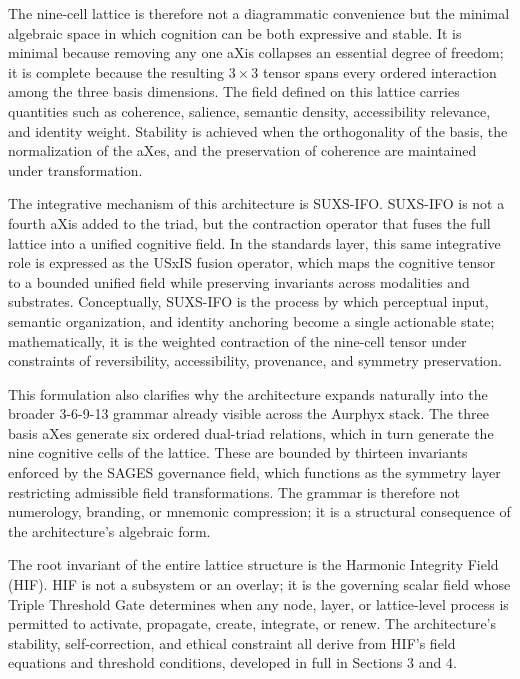 The nine-cell lattice is therefore not a diagrammatic convenience but the minimal algebraic space in which cognition can be both expressive and stable. It is minimal because removing any one aXis collapses an essential degree of freedom; it is complete because the resulting \(3 \times 3\) tensor spans every ordered interaction among the three basis dimensions. The field defined on this lattice carries quantities such as coherence, salience, semantic density, accessibility relevance, and identity weight. Stability is achieved when the orthogonality of the basis, the normalization of the aXes, and the preservation of coherence are maintained under transformation.

The integrative mechanism of this architecture is SUXS-IFO. SUXS-IFO is not a fourth aXis added to the triad, but the contraction operator that fuses the full lattice into a unified cognitive field. In the standards layer, this same integrative role is expressed as the USxIS fusion operator, which maps the cognitive tensor to a bounded unified field while preserving invariants across modalities and substrates. Conceptually, SUXS-IFO is the process by which perceptual input, semantic organization, and identity anchoring become a single actionable state; mathematically, it is the weighted contraction of the nine-cell tensor under constraints of reversibility, accessibility, provenance, and symmetry preservation.

This formulation also clarifies why the architecture expands naturally into the broader 3-6-9-13 grammar already visible across the Aurphyx stack. The three basis aXes generate six ordered dual-triad relations, which in turn generate the nine cognitive cells of the lattice. These are bounded by thirteen invariants enforced by the SAGES governance field, which functions as the symmetry layer restricting admissible field transformations. The grammar is therefore not numerology, branding, or mnemonic compression; it is a structural consequence of the architecture's algebraic form.

The root invariant of the entire lattice structure is the Harmonic Integrity Field (HIF). HIF is not a subsystem or an overlay; it is the governing scalar field whose Triple Threshold Gate determines when any node, layer, or lattice-level process is permitted to activate, propagate, create, integrate, or renew. The architecture's stability, self-correction, and ethical constraint all derive from HIF's field equations and threshold conditions, developed in full in Sections 3 and 4.

